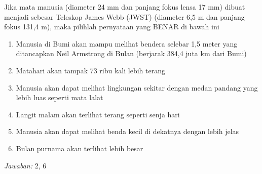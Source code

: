 \documentclass[11pt,fleqn]{exam}
\begin{document}
\begin{questions}
\vspace{0.5cm}
\question Jika mata manusia (diameter 24 mm dan panjang fokus lensa 17 mm) dibuat menjadi sebesar Teleskop James Webb (JWST) (diameter 6,5 m dan panjang fokus 131,4 m), maka pilihlah pernyataan yang BENAR di bawah ini
\begin{enumerate}
    \item Manusia di Bumi akan mampu melihat bendera selebar 1,5 meter yang ditancapkan Neil Armstrong di Bulan (berjarak 384,4 juta km dari Bumi)
    \item Matahari akan tampak 73 ribu kali lebih terang
    \item Manusia akan dapat melihat lingkungan sekitar dengan medan pandang yang lebih luas seperti mata lalat
    \item Langit malam akan terlihat terang seperti senja hari
    \item Manusia akan dapat melihat benda kecil di dekatnya dengan lebih jelas
    \item Bulan purnama akan terlihat lebih besar
\end{enumerate} 

\bigskip
\textit{Jawaban: } 2, 6


\end{questions}
\end{document}
